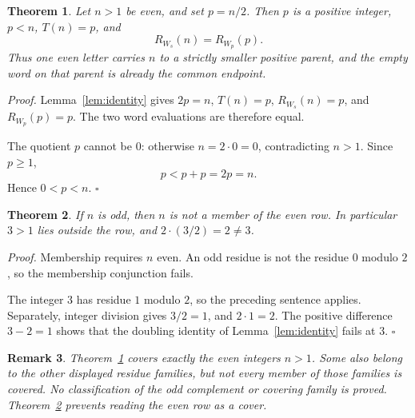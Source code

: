 \documentclass[11pt,letterpaper]{article}
\newtheorem{theorem}{Theorem}
\newtheorem{remark}[theorem]{Remark}
\newenvironment{proof}{\noindent\textit{Proof.}}{\hfill\(\square\)}
\begin{document}
\begin{theorem}
\label{thm:even-split}
Let \(n>1\) be even, and set \(p=n/2\). Then \(p\) is a positive integer, \(p<n\), \(T(n)=p\), and
\[
R_{W_s}(n)=R_{W_p}(p).
\]
Thus one even letter carries \(n\) to a strictly smaller positive parent, and the empty word on that parent is already the common endpoint.
\end{theorem}

\begin{proof}
Lemma~\ref{lem:identity} gives \(2p=n\), \(T(n)=p\), \(R_{W_s}(n)=p\), and \(R_{W_p}(p)=p\). The two word evaluations are therefore equal.

The quotient \(p\) cannot be \(0\): otherwise \(n=2\cdot 0=0\), contradicting \(n>1\). Since \(p\ge 1\),
\[
p<p+p=2p=n.
\]
Hence \(0<p<n\).
\end{proof}

\begin{theorem}
\label{thm:odd-outside}
If \(n\) is odd, then \(n\) is not a member of the even row. In particular \(3>1\) lies outside the row, and \(2\cdot(3/2)=2\neq 3\).
\end{theorem}

\begin{proof}
Membership requires \(n\) even. An odd residue is not the residue \(0\) modulo \(2\), so the membership conjunction fails.

The integer \(3\) has residue \(1\) modulo \(2\), so the preceding sentence applies. Separately, integer division gives \(3/2=1\), and \(2\cdot 1=2\). The positive difference \(3-2=1\) shows that the doubling identity of Lemma~\ref{lem:identity} fails at \(3\).
\end{proof}

\begin{remark}
Theorem~\ref{thm:even-split} covers exactly the even integers \(n>1\).
Some also belong to the other displayed residue families, but not every
member of those families is covered. No classification of the odd
complement or covering family is proved.
Theorem~\ref{thm:odd-outside} prevents reading the even row as a cover.
\end{remark}
\end{document}
